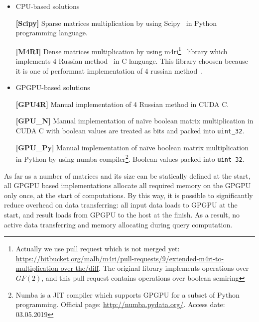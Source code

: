 \begin{itemize}
  \item CPU-based solutions

    \textbf{[Scipy]} Sparse matrices multiplication by using Scipy~\cite{scipy} in Python programming language.

    \textbf{[M4RI]} Dense matrices multiplication by using m4ri\footnote{Actually we use pull request which is not merged yet: \url{https://bitbucket.org/malb/m4ri/pull-requests/9/extended-m4ri-to-multiplication-over-the/diff}. The original library implements operations over $GF(2)$, and this pull request contains operations over boolean semiring}~\cite{M4RI} library which implements 4 Russian method~\cite{arlazarov1970economical} in C language.
    This library choosen because it is one of performnat implementation of 4 russian method~\cite{albrechtefficient}.
  \item GPGPU-based solutions

    \textbf{[GPU4R]} Manual implementation of 4 Russian method in CUDA C.

    \textbf{[GPU\_N]} Manual implementation of na\"ive boolean matrix multiplication in CUDA C with boolean values are treated as bits and packed into \texttt{uint\_32}.

    \textbf{[GPU\_Py]} Manual implementation of na\"ive boolean matrix multiplication in Python by using numba compiler\footnote{Numba is a JIT compiler which supports GPGPU for a subset of Python programming. Official page: \url{http://numba.pydata.org/}. Access date: 03.05.2019}.
    Boolean values packed into \texttt{uint\_32}.

\end{itemize}

As far as a number of matrices and its size can be statically defined at the start, all GPGPU based implementations allocate all required memory on the GPGPU only once, at the start of computations.
By this way, it is possible to significantly reduce overhead on data transferring: all input data loads to GPGPU at the start, and result loads from GPGPU to the host at the finish.
As a result, no active data transferring and memory allocating during query computation.